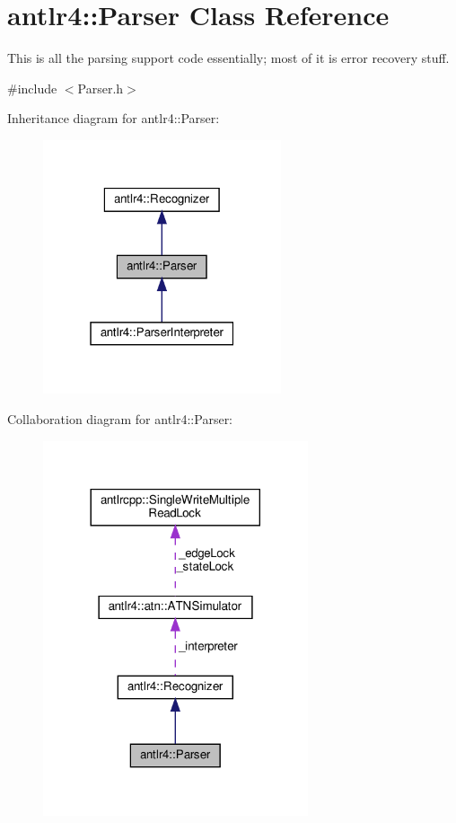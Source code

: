 \hypertarget{classantlr4_1_1Parser}{}\section{antlr4\+:\+:Parser Class Reference}
\label{classantlr4_1_1Parser}


This is all the parsing support code essentially; most of it is error recovery stuff.  




{\ttfamily \#include $<$Parser.\+h$>$}



Inheritance diagram for antlr4\+:\+:Parser\+:
\nopagebreak
\begin{figure}[H]
\begin{center}
\leavevmode
\includegraphics[width=199pt]{classantlr4_1_1Parser__inherit__graph}
\end{center}
\end{figure}


Collaboration diagram for antlr4\+:\+:Parser\+:
\nopagebreak
\begin{figure}[H]
\begin{center}
\leavevmode
\includegraphics[width=221pt]{classantlr4_1_1Parser__coll__graph}
\end{center}
\end{figure}
